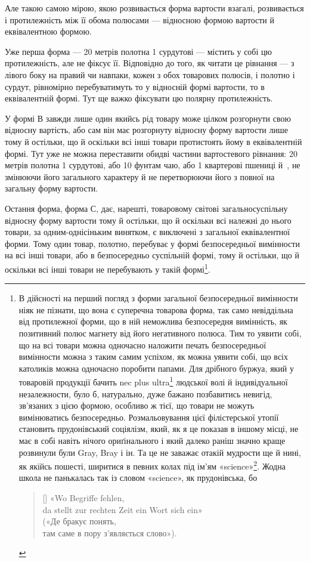 Але такою самою мірою, якою розвивається форма вартости
взагалі, розвивається і протилежність між її обома полюсами —
відносною формою вартости й еквівалентною формою.

Уже перша форма — 20 метрів полотна \deq{} 1 сурдутові —
містить у собі цю протилежність, але не фіксує її. Відповідно до
того, як читати це рівнання — з лівого боку на правий чи навпаки,
кожен з обох товарових полюсів, і полотно і сурдут, рівномірно
перебуватимуть то у відносній формі вартости, то в еквівалентній
формі. Тут ще важко фіксувати цю полярну протилежність.

У формі $В$ завжди лише один якийсь рід товару може цілком
розгорнути свою відносну вартість, або сам він має розгорнуту
відносну форму вартости лише тому й остільки, що й оскільки
всі інші товари протистоять йому в еквівалентній формі. Тут уже
не можна переставити обидві частини вартостевого рівнання: 20 метрів
полотна \deq{} 1 сурдутові, або \deq{} 10 фунтам чаю, або \deq{} 1 квартерові
пшениці й~, не змінюючи його загального характеру
й не перетворюючи його з повної на загальну форму вартости.

Остання форма, форма $С$, дає, нарешті, товаровому світові
загальносуспільну відносну форму вартости тому й остільки,
що й оскільки всі належні до нього товари, за одним-однісіньким
винятком, є виключені з загальної еквівалентної форми. Тому
один товар, полотно, перебуває у формі безпосередньої вимінности
на всі інші товари, або в безпосередньо суспільній формі, тому
й остільки, що й оскільки всі інші товари не перебувають у такій
формі\footnote{
В дійсності на перший погляд з форми загальної безпосередньої
вимінности ніяк не пізнати, що вона є суперечна товарова форма, так
само невіддільна від протилежної форми, що в ній неможлива безпосередня
вимінність, як позитивний полюс магнету від його негативного полюса.
Тим то уявити собі, що на всі товари можна одночасно наложити печать
безпосередньої вимінности можна з таким самим успіхом, як можна
уявити собі, що всіх католиків можна одночасно поробити папами. Для
дрібного буржуа, який у товаровій продукції бачить nec plus ultra\footnote*{
вершину. \emph{Ред}} людської волі й індивідуальної незалежности, було б, натурально, дуже
бажано позбавитись невигід, зв’язаних з цією формою, особливо ж тієї, що
товари не можуть вимінюватись безпосередньо. Розмальовування цієї філістерської
утопії становить прудонівський соціялізм, який, як я це показав
в іншому місці, не має в собі навіть нічого ориґінального і який далеко
раніш значно краще розвинули були Gray, Bray і ін. Та це не заважає
отакій мудрости ще й нині, як якійсь пошесті, ширитися в певних колах
під ім’ям «science»\footnote*{«наука». \emph{Ред.}}.
Жодна школа не панькалась так із словом «science», як прудонівська, бо
\settowidth{\versewidth}{da stellt zur rechten Zeit ein Wort sich ein»}
\begin{verse}[\versewidth]
«Wo Begriffe fehlen,\\
da stellt zur rechten Zeit ein Wort sich ein»\\
\smallskip
(«Де бракує понять,\\
там саме в пору з’являється слово»).
\end{verse}}.

